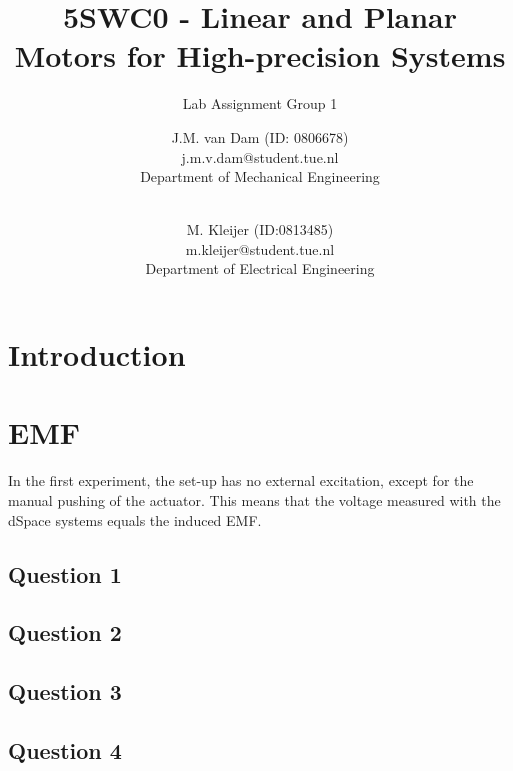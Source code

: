 \documentclass{scrartcl}
\title{5SWC0 - Linear and Planar Motors for High-precision Systems}
\subtitle{Lab Assignment Group 1}
\newcommand\tab[1][0.5cm]{\hspace*{#1}}
\begin{document}
\begin{titlepage}
\author{J.M. van Dam (ID: 0806678)\\j.m.v.dam@student.tue.nl\\Department of Mechanical Engineering
\and \\
M. Kleijer (ID:0813485)\\m.kleijer@student.tue.nl\\Department of Electrical Engineering}


\clearpage\maketitle
\thispagestyle{empty}
\end{titlepage}

\newpage
\setcounter{page}{1}

\section{Introduction}
	\label{1}
	

\section{EMF}
\tab In the first experiment, the set-up has no external excitation, except for the manual pushing of the actuator. This means that the voltage measured with the dSpace systems equals the induced EMF.

	\subsection{Question 1}
    \label{2a}
    
    
    \subsection{Question 2}
    \label{2b}
    
    
    \subsection{Question 3}
    \label{2c}
    
    
    \subsection{Question 4}
    \label{2d}
    
\end{document}
